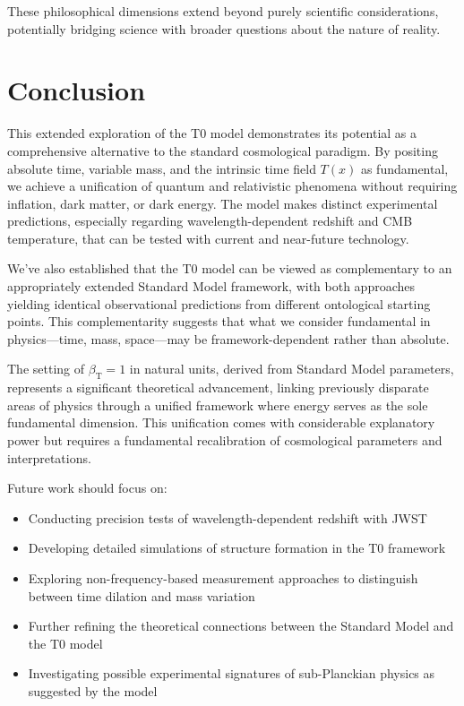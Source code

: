 \documentclass[12pt,a4paper]{article}
\newcommand{\Tfield}{T(x)}
\newcommand{\betaT}{\beta_{\text{T}}}
\begin{document}
	These philosophical dimensions extend beyond purely scientific considerations, potentially bridging science with broader questions about the nature of reality.
	
	\section{Conclusion}
	\label{sec:conclusion}
	
	This extended exploration of the T0 model demonstrates its potential as a comprehensive alternative to the standard cosmological paradigm. By positing absolute time, variable mass, and the intrinsic time field \(\Tfield\) as fundamental, we achieve a unification of quantum and relativistic phenomena without requiring inflation, dark matter, or dark energy. The model makes distinct experimental predictions, especially regarding wavelength-dependent redshift and CMB temperature, that can be tested with current and near-future technology.
	
	We've also established that the T0 model can be viewed as complementary to an appropriately extended Standard Model framework, with both approaches yielding identical observational predictions from different ontological starting points. This complementarity suggests that what we consider fundamental in physics—time, mass, space—may be framework-dependent rather than absolute.
	
	The setting of \(\betaT = 1\) in natural units, derived from Standard Model parameters, represents a significant theoretical advancement, linking previously disparate areas of physics through a unified framework where energy serves as the sole fundamental dimension. This unification comes with considerable explanatory power but requires a fundamental recalibration of cosmological parameters and interpretations.
	
	Future work should focus on:
	\begin{itemize}
		\item Conducting precision tests of wavelength-dependent redshift with JWST
		\item Developing detailed simulations of structure formation in the T0 framework
		\item Exploring non-frequency-based measurement approaches to distinguish between time dilation and mass variation
		\item Further refining the theoretical connections between the Standard Model and the T0 model
		\item Investigating possible experimental signatures of sub-Planckian physics as suggested by the model
	\end{itemize}
	
\end{document}
